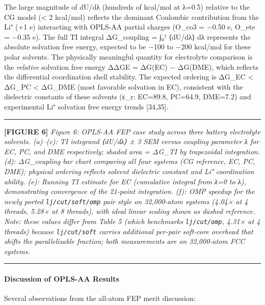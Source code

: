 \documentclass[
  11pt,
]{article}
\begin{document}
The large magnitude of dU/dλ (hundreds of kcal/mol at λ=0.5) relative to
the CG model (\textless{} 2 kcal/mol) reflects the dominant Coulombic
contribution from the Li⁺ (+1 e) interacting with OPLS-AA partial
charges (O\_co3 = −0.50 e, O\_ete = −0.35 e). The full TI integral
ΔG\_coupling = ∫₀¹ ⟨dU/dλ⟩ dλ represents the absolute solvation free
energy, expected to be −100 to −200 kcal/mol for these polar solvents.
The physically meaningful quantity for electrolyte comparison is the
\emph{relative} solvation free energy ΔΔGE = ΔG(EC) − ΔG(DME), which
reflects the differential coordination shell stability. The expected
ordering is ΔG\_EC \textless{} ΔG\_PC \textless{} ΔG\_DME (most
favorable solvation in EC), consistent with the dielectric constants of
these solvents (ε\_r: EC=89.8, PC=64.9, DME=7.2) and experimental Li⁺
solvation free energy trends {[}34,35{]}.

\begin{center}\rule{0.5\linewidth}{0.5pt}\end{center}

\textbf{{[}FIGURE 6{]}} \emph{Figure 6: OPLS-AA FEP case study across
three battery electrolyte solvents. (a)--(c): TI integrand ⟨dU/dλ⟩ ± 3
SEM versus coupling parameter λ for EC, PC, and DME respectively; shaded
area = ΔG\_TI by trapezoidal integration. (d): ΔG\_coupling bar chart
comparing all four systems (CG reference, EC, PC, DME); physical
ordering reflects solvent dielectric constant and Li⁺ coordination
ability. (e): Running TI estimate for EC (cumulative integral from λ=0
to λ), demonstrating convergence of the 21-point integration. (f): OMP
speedup for the newly ported \texttt{lj/cut/soft/omp} pair style on
32,000-atom systems (4.04× at 4 threads, 5.28× at 8 threads), with ideal
linear scaling shown as dashed reference. Note: these values differ from
Table 5 (which benchmarks \texttt{lj/cut/omp}, 4.31× at 4 threads)
because \texttt{lj/cut/soft} carries additional per-pair soft-core
overhead that shifts the parallelizable fraction; both measurements are
on 32,000-atom FCC systems.}

\begin{center}\rule{0.5\linewidth}{0.5pt}\end{center}

\paragraph{Discussion of OPLS-AA
Results}\label{discussion-of-opls-aa-results}

Several observations from the all-atom FEP merit discussion:
\end{document}
